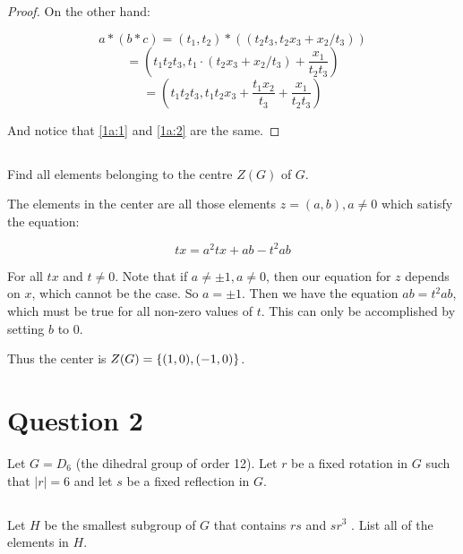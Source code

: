 \documentclass[a4paper,12pt]{article}
\DeclarePairedDelimiter{\set}{\lbrace}{\rbrace}
\begin{document}
\begin{proof}
On the other hand:

\begin{equation*}
a \ast (b \ast c) = (t_1, t_2) \ast ((t_2 t_3, t_2 x_3 + x_2 / t_3))
\end{equation*}
\begin{equation*}
= (t_1 t_2 t_3, t_1 \cdot (t_2 x_3 + x_2 / t_3) + \frac{x_1}{t_2t_3})
\end{equation*}
\begin{equation} \label{1a:2}
= (t_1 t_2 t_3, t_1t_2x_3 + \frac{t_1x_2}{t_3} + \frac{x_1}{t_2t_3})
\end{equation}

And notice that \eqref{1a:1} and \eqref{1a:2} are the same.

\end{proof}

\subsection{}

Find all elements belonging to the centre $Z(G)$ of $G$. 

The elements in the center are all those elements $z = (a, b), a \neq 0$ which satisfy the equation:

\begin{equation}
tx = a^2tx + ab - t^2ab
\end{equation}

For all $tx$ and $t \neq 0$. Note that if $a \neq \pm 1, a \neq 0$, then our equation for $z$ depends on $x$, which cannot be the case. So $a = \pm 1$. Then we have the equation $ab = t^2ab$, which must be true for all non-zero values of $t$. This can only be accomplished by setting $b$ to 0.

Thus the center is $Z(G) = \set{(1, 0), (-1, 0)}$.

\section{Question 2}

Let $G = D_6$ (the dihedral group of order 12). Let $r$ be a fixed rotation in $G$ such that $\left|r\right| = 6$ and let $s$ be a fixed reflection in $G$.

\subsection{}

Let $H$ be the smallest subgroup of $G$ that contains $rs$ and $sr^3$ . List all of the elements in $H$.
\end{document}
